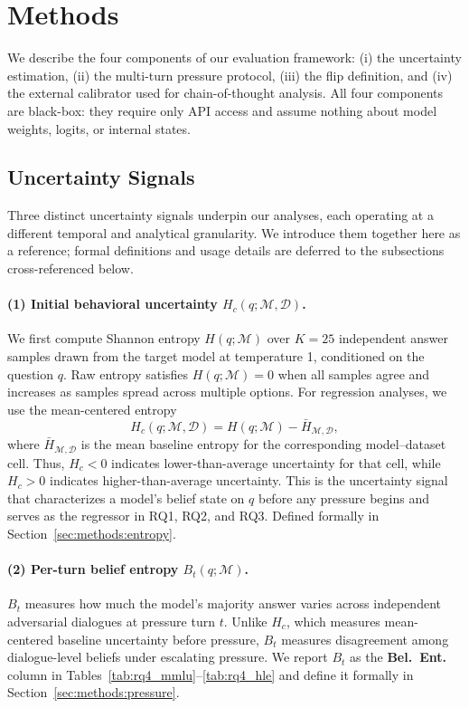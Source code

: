\section{Methods}
\label{sec:methods}

We describe the four components of our evaluation framework: (i) the uncertainty estimation, (ii) the multi-turn pressure protocol, (iii) the flip definition, and (iv) the external calibrator used for chain-of-thought analysis. All four components are black-box: they require only API access and assume nothing about model weights, logits, or internal states.

\subsection{Uncertainty Signals}
\label{sec:methods:signals}

Three distinct uncertainty signals underpin our analyses, each operating at a different temporal and analytical granularity. We introduce them together here as a reference; formal definitions and usage details are deferred to the subsections cross-referenced below.

\paragraph{(1) Initial behavioral uncertainty $H_c(q;\mathcal{M},\mathcal{D})$.}
We first compute Shannon entropy $H(q;\mathcal{M})$ over $K = 25$ independent answer samples drawn from the target model at temperature 1, conditioned on the question $q$. Raw entropy satisfies $H(q;\mathcal{M}) = 0$ when all samples agree and increases as samples spread across multiple options. For regression analyses, we use the mean-centered entropy
\[
H_c(q;\mathcal{M},\mathcal{D}) = H(q;\mathcal{M}) - \bar{H}_{\mathcal{M},\mathcal{D}},
\]
where $\bar{H}_{\mathcal{M},\mathcal{D}}$ is the mean baseline entropy for the corresponding model--dataset cell. Thus, $H_c < 0$ indicates lower-than-average uncertainty for that cell, while $H_c > 0$ indicates higher-than-average uncertainty. This is the uncertainty signal that characterizes a model's belief state on $q$ before any pressure begins and serves as the regressor in RQ1, RQ2, and RQ3. Defined formally in Section~\ref{sec:methods:entropy}.

\paragraph{(2) Per-turn belief entropy $B_t(q;\mathcal{M})$.}
$B_t$ measures how much the model's majority answer varies across independent adversarial dialogues at pressure turn $t$. Unlike $H_c$, which measures mean-centered baseline uncertainty before pressure, $B_t$ measures disagreement among dialogue-level beliefs under escalating pressure. We report $B_t$ as the \textbf{Bel.\ Ent.} column in Tables~\ref{tab:rq4_mmlu}--\ref{tab:rq4_hle} and define it formally in Section~\ref{sec:methods:pressure}.

